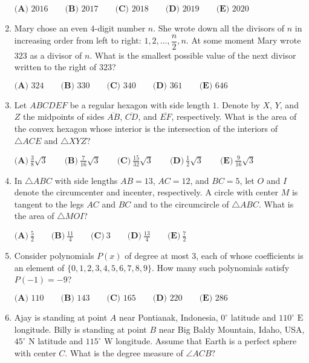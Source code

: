 \documentclass{article}
\begin{document}
\begin{enumerate}[label=\arabic*., itemsep=0.5em]
\(\textbf{(A) } 2016 \qquad \textbf{(B) } 2017 \qquad \textbf{(C) } 2018 \qquad \textbf{(D) } 2019 \qquad \textbf{(E) } 2020\)\par \vspace{0.5em}\item Mary chose an even \(4\)-digit number \(n\). She wrote down all the divisors of \(n\) in increasing order from left to right: \(1,2,\ldots,\dfrac{n}{2},n\). At some moment Mary wrote \(323\) as a divisor of \(n\). What is the smallest possible value of the next divisor written to the right of \(323\)?

\(\textbf{(A) } 324 \qquad \textbf{(B) } 330 \qquad \textbf{(C) } 340 \qquad \textbf{(D) } 361 \qquad \textbf{(E) } 646\)\par \vspace{0.5em}\item Let \(ABCDEF\) be a regular hexagon with side length \(1\). Denote by \(X\), \(Y\), and \(Z\) the midpoints of sides \(\overline {AB}\), \(\overline{CD}\), and \(\overline{EF}\), respectively. What is the area of the convex hexagon whose interior is the intersection of the interiors of \(\triangle ACE\) and \(\triangle XYZ\)?

\(\textbf{(A)}\ \frac {3}{8}\sqrt{3} \qquad \textbf{(B)}\ \frac {7}{16}\sqrt{3} \qquad \textbf{(C)}\ \frac {15}{32}\sqrt{3} \qquad  \textbf{(D)}\ \frac {1}{2}\sqrt{3} \qquad \textbf{(E)}\ \frac {9}{16}\sqrt{3} \)\par \vspace{0.5em}\item In \(\triangle{ABC}\) with side lengths \(AB = 13\), \(AC = 12\), and \(BC = 5\), let \(O\) and \(I\) denote the circumcenter and incenter, respectively. A circle with center \(M\) is tangent to the legs \(AC\) and \(BC\) and to the circumcircle of \(\triangle{ABC}\). What is the area of \(\triangle{MOI}\)?

\(\textbf{(A)}\ \frac52\qquad\textbf{(B)}\ \frac{11}{4}\qquad\textbf{(C)}\ 3\qquad\textbf{(D)}\ \frac{13}{4}\qquad\textbf{(E)}\ \frac72\)\par \vspace{0.5em}\item Consider polynomials \(P(x)\) of degree at most \(3\), each of whose coefficients is an element of \(\{0, 1, 2, 3, 4, 5, 6, 7, 8, 9\}\). How many such polynomials satisfy \(P(-1) = -9\)?

\(\textbf{(A) } 110 \qquad \textbf{(B) } 143 \qquad \textbf{(C) } 165 \qquad \textbf{(D) } 220 \qquad \textbf{(E) } 286 \)\par \vspace{0.5em}\item Ajay is standing at point \(A\) near Pontianak, Indonesia, \(0^\circ\) latitude and \(110^\circ \text{ E}\) longitude. Billy is standing at point \(B\) near Big Baldy Mountain, Idaho, USA, \(45^\circ \text{ N}\) latitude and \(115^\circ \text{ W}\) longitude. Assume that Earth is a perfect sphere with center \(C.\) What is the degree measure of \(\angle ACB?\)


\end{enumerate}
\end{document}

